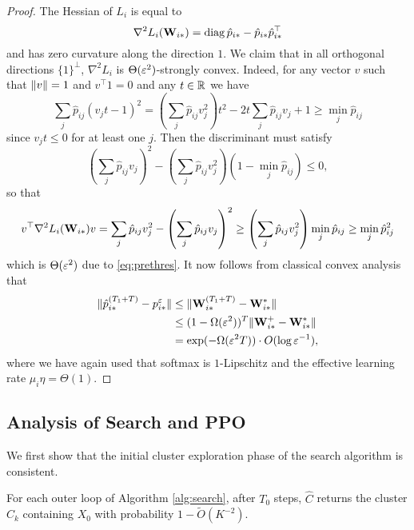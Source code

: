\begin{proof}
The Hessian of $L_i$ is equal to
\begin{equation*}
\nabla^2 L_i(\mathbf{W}_{i*}) = \operatorname{diag} \hat{p}_{i*} - \hat{p}_{i*}\hat{p}_{i*}^\top
\end{equation*}
and has zero curvature along the direction $1$. We claim that in all orthogonal directions $\{1\}^\perp$, $\nabla^2 L_i$ is $\Theta(\varepsilon^2)$-strongly convex. Indeed, for any vector $v$ such that $\lVert v\rVert=1$ and $v^\top 1=0$ and any $t\in\mathbb{R}$ we have
\begin{equation*}
\sum_j \hat{p}_{ij}(v_jt-1)^2 = \left(\sum_j \hat{p}_{ij}v_j^2\right) t^2 -2t\sum_j \hat{p}_{ij}v_j + 1\ge \min_j \hat{p}_{ij}
\end{equation*}
since $v_jt\le 0$ for at least one $j$. Then the discriminant must satisfy
\begin{equation*}
\left(\sum_j \hat{p}_{ij}v_j\right)^2 - \left(\sum_j \hat{p}_{ij}v_j^2\right) \left(1-\min_j \hat{p}_{ij}\right) \le 0,
\end{equation*}
so that
\begin{align*}
v^\top \nabla^2 L_i(\mathbf{W}_{i*}) v = \sum_j \hat{p}_{ij}v_j^2 - \left(\sum_j \hat{p}_{ij}v_j\right)^2 \ge \left(\sum_j \hat{p}_{ij}v_j^2\right) \min_j \hat{p}_{ij} \ge \min_j \hat{p}_{ij}^2
\end{align*}
which is $\Theta(\varepsilon^2)$ due to \eqref{eq:prethres}. It now follows from classical convex analysis that
\begin{align*}
\lVert\hat{p}_{i*}^{(T_1+T)} - p_{i*}^\varepsilon\rVert &\le \lVert\mathbf{W}_{i*}^{(T_1+T)}-\mathbf{W}_{i*}^*\rVert\\
&\le (1-\Omega(\varepsilon^2))^T \lVert\mathbf{W}_{i*}^+-\mathbf{W}_{i*}^*\rVert \\
&= \exp(-\Omega(\varepsilon^2T))\cdot O(\log\varepsilon^{-1}),
\end{align*}
where we have again used that softmax is $1$-Lipschitz and the effective learning rate $\mu_i\eta=\Theta(1)$.
\end{proof}

\subsection{Analysis of Search and PPO}

We first show that the initial cluster exploration phase of the search algorithm is consistent.

\begin{lemma}
For each outer loop of Algorithm \ref{alg:search}, after $T_0$ steps, $\hat{C}$ returns the cluster $C_k$ containing $X_0$ with probability $1-\widetilde{O}(K^{-2})$.
\end{lemma}

